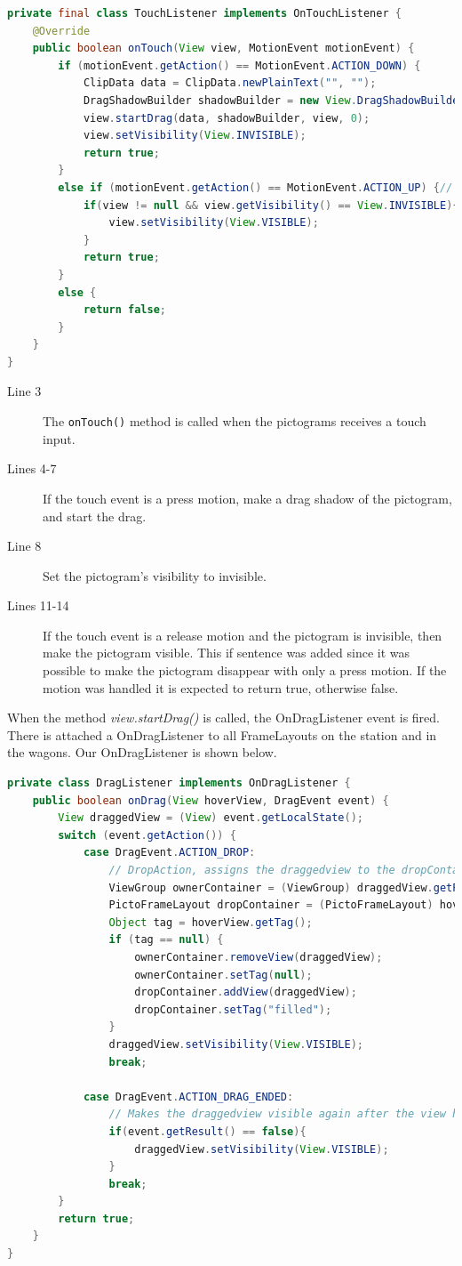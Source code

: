 \begin{lstlisting}[language=java,firstnumber=1,caption={Our TouchListener},label=lst:ourtouchlistener] 
private final class TouchListener implements OnTouchListener {
	@Override
	public boolean onTouch(View view, MotionEvent motionEvent) {
		if (motionEvent.getAction() == MotionEvent.ACTION_DOWN) {
			ClipData data = ClipData.newPlainText("", "");
			DragShadowBuilder shadowBuilder = new View.DragShadowBuilder(view);
			view.startDrag(data, shadowBuilder, view, 0);
			view.setVisibility(View.INVISIBLE);
			return true;
		}
		else if (motionEvent.getAction() == MotionEvent.ACTION_UP) {// prevents that a pictogram disappears if only pressed and no drag
			if(view != null && view.getVisibility() == View.INVISIBLE){
				view.setVisibility(View.VISIBLE);
			}
			return true;
		}
		else {
			return false;
		}
	}
}
\end{lstlisting}
\begin{description}
\item[Line 3] The \lstinline|onTouch()| method is called when the pictograms receives a touch input.
\item[Lines 4-7] If the touch event is a press motion, make a drag shadow of the pictogram, and start the drag.
\item[Line 8] Set the pictogram's visibility to invisible.
\item[Lines 11-14] If the touch event is a release motion and the pictogram is invisible, then make the pictogram visible. This if sentence was added since it was possible to make the pictogram disappear with only a press motion. If the motion was handled it is expected to return true, otherwise false.
\end{description}
When the method \textit{view.startDrag()} is called, the OnDragListener event is fired. There is attached a OnDragListener to all FrameLayouts on the station and in the wagons. Our OnDragListener is shown below.
\begin{lstlisting}[language=java,firstnumber=1,caption={Our DragListener},label=lst:ourdraglistener] 
private class DragListener implements OnDragListener {
	public boolean onDrag(View hoverView, DragEvent event) {
	    View draggedView = (View) event.getLocalState();
		switch (event.getAction()) {
			case DragEvent.ACTION_DROP:
				// DropAction, assigns the draggedview to the dropContainer if, the dropContainer does not already contain a pictogram.
				ViewGroup ownerContainer = (ViewGroup) draggedView.getParent();
				PictoFrameLayout dropContainer = (PictoFrameLayout) hoverView;
				Object tag = hoverView.getTag();
				if (tag == null) {
					ownerContainer.removeView(draggedView);
					ownerContainer.setTag(null);
					dropContainer.addView(draggedView);
					dropContainer.setTag("filled");
				}
				draggedView.setVisibility(View.VISIBLE);
				break;

			case DragEvent.ACTION_DRAG_ENDED:
				// Makes the draggedview visible again after the view has been moved or if drop wasn't valid.
				if(event.getResult() == false){
					draggedView.setVisibility(View.VISIBLE);
				}
				break;
		}
		return true;
	}
}
\end{lstlisting}
